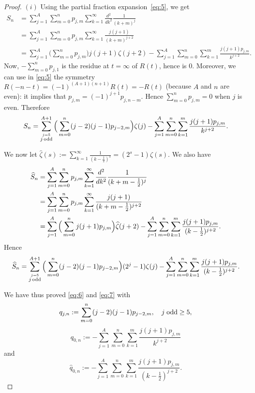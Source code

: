 \documentclass[reqno,12pt]{article}
\theoremstyle{remark}
\begin{document}
\begin{proof} $(i)$ Using the partial fraction expansion~\eqref{eq:5}, we get
\begin{align*}
S_n
&=\sum_{j=1}^A \sum_{m=0}^{n} p_{j,m} \sum_{k=1}^\infty \frac{d^2}{dk^2}\frac{1}{(k+m)^j}\\
&=\sum_{j=1}^A \sum_{m=0}^{n} p_{j,m} \sum_{k=1}^\infty \frac{j(j+1)}{(k+m)^{j+2}}\\
&=\sum_{j=1}^A \Big(\sum_{m=0}^{n} p_{j,m}\Big) j(j+1)\zeta(j+2)-\sum_{j=1}^A\sum_{m=0}^{n}\sum_{k=1}^{m} \frac{j(j+1)p_{j,m}}{k^{j+2}}.
\end{align*}
Now, $-\sum_{m=0}^{n} p_{j,1}$ is the residue at $t=\infty$ of $R(t)$, hence is $0$. Moreover, we can use in \eqref{eq:5} the symmetry $R(-n-t)=(-1)^{(A+1)(n+1)}R(t)=-R(t)$ (because $A$ and $n$ are even): it implies that $p_{j,m}=(-1)^{j+1}p_{j,n-m}$. Hence
$
\sum_{m=0}^{n} p_{j,m}=0
$
when $j$ is even. Therefore
$$
S_n=\sum_{\stackrel{j=5}{j\, \textup{odd}}}^{A+1} \Big(\sum_{m=0}^{n} (j-2)(j-1)p_{j-2,m}\Big) \zeta(j)-\sum_{j=1}^A\sum_{m=0}^{n}\sum_{k=1}^{m} \frac{j(j+1)p_{j,m}}{k^{j+2}}.
$$

We now let $\widehat{\zeta}(s):=\sum_{k=1}^\infty \frac{1}{(k-\frac12)^s}=(2^s-1)\zeta(s)$. 
We also have
\begin{align}
\widehat{S}_n
&=\sum_{j=1}^A \sum_{m=0}^{n} p_{j,m} \sum_{k=1}^\infty \frac{d^2}{dk^2}\frac{1}{(k+m-\frac12)^j}\notag
\\
&=\sum_{j=1}^A \sum_{m=0}^{n} p_{j,m} \sum_{k=1}^\infty \frac{j(j+1)}{(k+m-\frac12)^{j+2}}\notag
\\
&=\sum_{j=1}^A \Big(\sum_{m=0}^{n} j(j+1)p_{j,m}\Big) \widehat{\zeta}(j+2)-\sum_{j=1}^A\sum_{m=0}^{n}\sum_{k=1}^{m} \frac{j(j+1)p_{j,m}}{(k-\frac12)^{j+2}}. \label{eq:9}
\end{align}
Hence
$$
\widehat{S}_n=\sum_{\stackrel{j=5}{j\, \textup{odd}}}^{A+1} \Big(\sum_{m=0}^{n} (j-2)(j-1)p_{j-2,m}\Big) (2^j-1)\zeta(j)-\sum_{j=1}^A\sum_{m=0}^{n}\sum_{k=1}^{m} \frac{j(j+1)p_{j,m}}{(k-\frac12)^{j+2}}.
$$

We have thus proved \eqref{eq:6} and \eqref{eq:7} with
\begin{equation}\label{eq:10}
q_{j,n}:=\sum_{m=0}^{n} (j-2)(j-1)p_{j-2,m}, \quad j\; \textup{odd} \ge 5,
\end{equation}
\begin{equation}\label{eq:11}
q_{0,n}:=-\sum_{j=1}^A\sum_{m=0}^{n}\sum_{k=1}^{m} \frac{j(j+1)p_{j,m}}{k^{j+2}}
\end{equation}
and
\begin{equation}\label{eq:8}
\widehat{q}_{0,n}:=-\sum_{j=1}^A\sum_{m=0}^{n}\sum_{k=1}^{m} \frac{j(j+1)p_{j,m}}{(k-\frac12)^{j+2}}.
\end{equation}


\end{proof}
\end{document}

